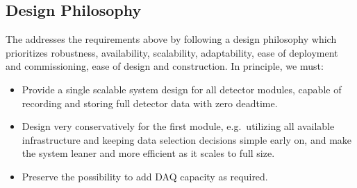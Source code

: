 
\subsection{Design Philosophy}

The    addresses the requirements above by following a
design philosophy which prioritizes robustness, availability,
scalability, adaptability, ease of
deployment and commissioning, ease of design and construction. In
principle, we must:
\begin{itemize}
\item Provide a single scalable system design for all detector
  modules, capable of recording and storing full detector data with
  zero deadtime.
\item Design very conservatively for the first module, e.g.~utilizing
  all available infrastructure and keeping data selection decisions
  simple early on, and make the system leaner and more efficient as it
  scales to full size.
\item Preserve the possibility to add DAQ capacity as required.
\end{itemize}

